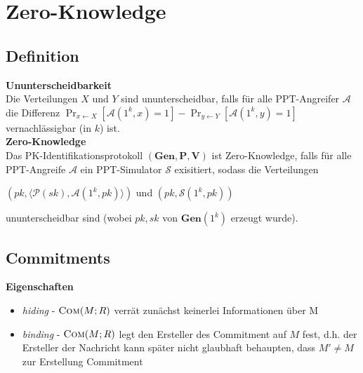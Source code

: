 \section{Zero-Knowledge}%
\label{zn:sec:zero-knowledge}

\subsection{Definition}%
\label{zn:sub:definition}
\textbf{Ununterscheidbarkeit}\\
Die Verteilungen \(X\) und \(Y\) sind ununterscheidbar, falls für alle PPT-Angreifer
\(\mathcal{A}\) die Differenz
\(\Pr_{x \leftarrow X}[\mathcal{A}(1^k, x) = 1] - \Pr_{y \leftarrow Y}[\mathcal{A}(1^k, y) = 1]\)
vernachlässigbar (in \(k\)) ist.\\
\textbf{Zero-Knowledge}\\
Das PK-Identifikationsprotokoll \((\mathbf{Gen}, \mathbf{P}, \mathbf{V})\) ist Zero-Knowledge, falls für alle
PPT-Angreife \(\mathcal{A}\) ein PPT-Simulator \(\mathcal{S}\) exisitiert, sodass die Verteilungen\\
\begin{center}
  \((\mathit{pk}, \langle\mathcal{P}(\mathit{sk}),\mathcal{A}(1^k, \mathit{pk})\rangle)\)
  und
  \((\mathit{pk}, \mathcal{S}(1^k, \mathit{pk}))\)
\end{center}
ununterscheidbar sind (wobei \(\mathit{pk}, \mathit{sk}\) von \(\mathbf{Gen}(1^k)\) erzeugt wurde).

\subsection{Commitments}%
\label{zn:sub:commitments}
\textbf{Eigenschaften}
\begin{itemize}
\item \textit{hiding} - \(\textsc{Com}(M; R)\) verrät zunächst keinerlei Informationen über M
\item \textit{binding} - \(\textsc{Com}(M; R)\) legt den Ersteller des Commitment auf \(M\) fest, d.h.
  der Ersteller der Nachricht kann später nicht glaubhaft behaupten, dass \(M' \neq M\) zur Erstellung
  Commitment
\end{itemize}